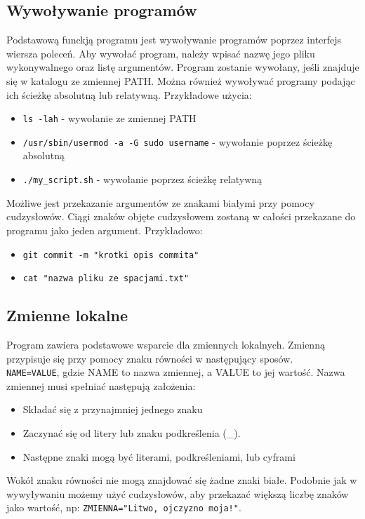 \documentclass{article}
\begin{document}
\subsection*{Wywoływanie programów}
Podstawową funckją programu jest wywoływanie programów poprzez interfejs wiersza poleceń. Aby wywołać program, należy
wpisać nazwę jego pliku wykonywalnego oraz listę argumentów. Program zostanie wywołany, jeśli znajduje się w katalogu
ze zmiennej PATH. Można również wywoływać programy podając ich ścieżkę absolutną lub relatywną. 
Przykładowe użycia:
\begin{itemize}
    \item \texttt{ls -lah} - wywołanie ze zmiennej PATH
    \item \texttt{/usr/sbin/usermod -a -G sudo username} - wywołanie poprzez ścieżkę absolutną
    \item \texttt{./my\_script.sh} - wywołanie poprzez ścieżkę relatywną
\end{itemize}

Możliwe jest przekazanie argumentów ze znakami białymi przy pomocy cudzysłowów. Ciągi znaków objęte cudzysłowem zostaną
w całości przekazane do programu jako jeden argument. Przykładowo:
\begin{itemize}
    \item \texttt{git commit -m "krotki opis commita"}
    \item \texttt{cat "nazwa pliku ze spacjami.txt"}
\end{itemize}


\subsection*{Zmienne lokalne}
Program zawiera podstawowe wsparcie dla zmiennych lokalnych. Zmienną przypisuje się przy pomocy znaku równości 
w następujący sposów.\\
\texttt{NAME=VALUE}, gdzie NAME to nazwa zmiennej, a VALUE to jej wartość. Nazwa zmiennej musi spełniać następują założenia:
\begin{itemize}
    \item Składać się z przynajmniej jednego znaku
    \item Zaczynać się od litery lub znaku podkreślenia (\_).
    \item Następne znaki mogą być literami, podkreśleniami, lub cyframi
\end{itemize}
Wokół znaku równości nie mogą znajdować się żadne znaki białe. Podobnie jak w wywyływaniu możemy użyć cudzysłowów, aby
przekazać większą liczbę znaków jako wartość, np: \texttt{ZMIENNA="Litwo, ojczyzno moja!"}.
\end{document}
